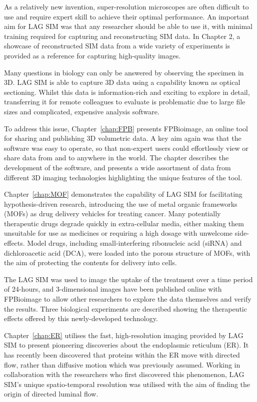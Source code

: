 As a relatively new invention, super-resolution microscopes are often difficult to use and require expert skill to achieve their optimal performance. 
An important aim for LAG SIM was that any researcher should be able to use it, with minimal training required for capturing and reconstructing SIM data. 
In Chapter 2, a showcase of reconstructed SIM data from a wide variety of experiments is provided as a reference for capturing high-quality images. 

Many questions in biology can only be answered by observing the specimen in 3D.
LAG SIM is able to capture 3D data using a capability known as optical sectioning.
Whilst this data is information-rich and exciting to explore in detail, transferring it for remote colleagues to evaluate is problematic due to large file sizes and complicated, expensive analysis software. 

To address this issue, Chapter~\ref{chap:FPB} presents FPBioimage, an online tool for sharing and publishing 3D volumetric data. 
A key aim again was that the software was easy to operate, so that non-expert users could effortlessly view or share data from and to anywhere in the world. 
The chapter describes the development of the software, and presents a wide assortment of data from different 3D imaging technologies highlighting the unique features of the tool. 

Chapter~\ref{chap:MOF} demonstrates the capability of LAG SIM for facilitating hypothesis-driven research, introducing the use of metal organic frameworks (MOFs) as drug delivery vehicles for treating cancer. 
Many potentially therapeutic drugs degrade quickly in extra-cellular media, either making them unsuitable for use as medicines or requiring a high dosage with unwelcome side-effects. 
Model drugs, including small-interfering ribonucleic acid (siRNA) and dichloroacetic acid (DCA), were loaded into the porous structure of MOFs, with the aim of protecting the contents for delivery into cells. 

The LAG SIM was used to image the uptake of the treatment over a time period of 24-hours, and 3-dimensional images have been published online with FPBioimage to allow other researchers to explore the data themselves and verify the results. 
Three biological experiments are described showing the therapeutic effects offered by this newly-developed technology. 

Chapter~\ref{chap:ER} utilises the fast, high-resolution imaging provided by LAG SIM to present pioneering discoveries about the endoplasmic reticulum (ER). 
It has recently been discovered that proteins within the ER move with directed flow, rather than diffusive motion which was previously assumed. 
Working in collaboration with the researchers who first discovered this phenomenon, LAG SIM's unique spatio-temporal resolution was utilised with the aim of finding the origin of directed luminal flow. 

